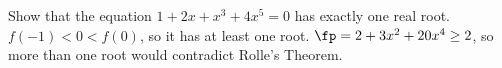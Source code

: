 {Show that the equation $1+2x+x^3+4x^5=0$ has exactly one real root.}
{$f(-1)<0<f(0)$, so it has at least one root. $\fp=2+3x^2+20x^4\ge2$, so more than one root would contradict Rolle's Theorem.}
